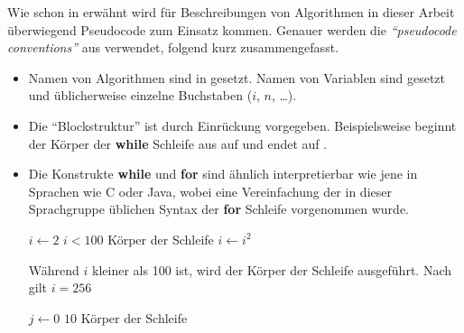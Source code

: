 
Wie schon in  erwähnt wird für Beschreibungen von Algorithmen in dieser Arbeit überwiegend Pseudocode zum Einsatz kommen. Genauer werden die \emph{\enquote{pseudocode conventions}} aus \cite[20ff]{clrs2001} verwendet, folgend kurz zusammengefasst.

\begin{itemize}
    \item Namen von Algorithmen sind in  gesetzt. Namen von Variablen sind  gesetzt und üblicherweise einzelne Buchstaben ($i$, $n$, \ldots).

    \item Die \enquote{Blockstruktur} ist durch Einrückung vorgegeben. Beispielsweise beginnt der Körper der \textbf{while} Schleife aus  auf  und endet auf .
    
    \item Die Konstrukte \textbf{while} und \textbf{for} sind ähnlich interpretierbar wie jene in Sprachen wie C oder Java, wobei eine Vereinfachung der in dieser Sprachgruppe üblichen Syntax der \textbf{for} Schleife vorgenommen wurde.

    \begin{minipage}[t]{0.48\linewidth}
        \begin{codebox}
            \li $i \gets 2$
            \li \While $i < 100$
            \li     \Do
                        \Comment Körper der Schleife
            \li         $i \gets i^2$
            \li     \End                            \label{ln:pseudocode-example-while-end}
        \end{codebox}
        
        Während $i$ kleiner als 100 ist, wird der Körper der Schleife ausgeführt. Nach  gilt $i = 256$ 
    \end{minipage}
    \hfill
    \begin{minipage}[t]{0.48\linewidth}
        \begin{codebox}
            \li \For $j \gets 0$ \To $10$
            \li     \Do
                        \Comment Körper der Schleife
                    \End
        \end{codebox}


\end{minipage}
\end{itemize}
